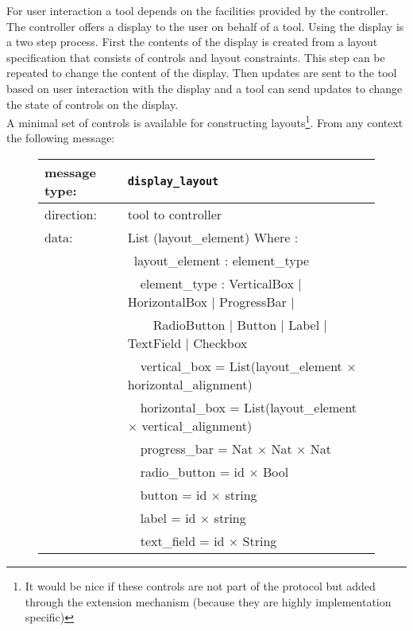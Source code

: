 \documentclass{article}
\newcommand{\msg}[1]{\texttt{#1}}
\begin{document}
   For user interaction a tool depends on the facilities provided by the
   controller. The controller offers a display to the user on behalf of a tool.
   Using the display is a two step process. First the contents of the display
   is created from a layout specification that consists of controls and layout
   constraints. This step can be repeated to change the content of the display.
   Then updates are sent to the tool based on user interaction with the display
   and a tool can send updates to change the state of controls on the display.
   \\[4pt]
   A minimal set of controls is available for constructing layouts\footnote{It
   would be nice if these controls are not part of the protocol but added
   through the extension mechanism (because they are highly implementation
   specific)}. From any context the following message:
   
   \begin{figure}[H]
    \begin{center}
     \begin{tabular}{|ll|}
      \hline
       message type:   & \msg{display\_layout} \\
      \hline
       direction:      & tool to controller \\
       data:           & List (layout\_element) Where :\\
                       & \ layout\_element :  element\_type \\
                       & \ \ element\_type   : VerticalBox $|$ HorizontalBox $|$ ProgressBar $|$ \\
                       & \ \ \ \ RadioButton $|$ Button $|$ Label $|$ TextField $|$ Checkbox \\
                       & \ \ vertical\_box   = List(layout\_element $\times$ horizontal\_alignment) \\
                       & \ \ horizontal\_box = List(layout\_element $\times$ vertical\_alignment) \\
                       & \ \ progress\_bar = Nat $\times$ Nat $\times$ Nat \\
                       & \ \ radio\_button = id $\times$ Bool \\
                       & \ \ button        = id $\times$ string \\
                       & \ \ label         = id $\times$ string \\
                       & \ \ text\_field   = id $\times$ String \\
      \hline
     \end{tabular}
    \end{center}
   \end{figure}
\end{document}
